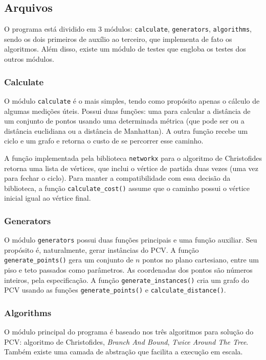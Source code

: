\documentclass{article}
\begin{document}
\subsection{Arquivos}
O programa está dividido em 3 módulos: \texttt{calculate}, \texttt{generators}, \texttt{algorithms}, sendo os dois primeiros de auxílio ao terceiro, que implementa de fato os algoritmos. Além disso, existe um módulo de testes que engloba os testes dos outros módulos.

\subsubsection{Calculate}

O módulo \texttt{calculate} é o mais simples, tendo como propósito apenas o cálculo de algumas medições úteis. Possui duas funções: uma para calcular a distância de um conjunto de pontos usando uma determinada métrica (que pode ser ou a distância euclidiana ou a distância de Manhattan). A outra função recebe um ciclo e um grafo e retorna o custo de se percorrer esse caminho.

A função implementada pela biblioteca \texttt{networkx} para o algoritmo de Christofides retorna uma lista de vértices, que inclui o vértice de partida duas vezes (uma vez para fechar o ciclo). Para manter a compatibilidade com essa decisão da biblioteca, a função \texttt{calculate\_cost()} assume que o caminho possui o vértice inicial igual ao vértice final.

\subsubsection{Generators}

O módulo \texttt{generators} possui duas funções principais e uma função auxiliar. Seu propósito é, naturalmente, gerar instâncias do PCV. A função \texttt{generate\_points()} gera um conjunto de \( n \) pontos no plano cartesiano, entre um piso e teto passados como parâmetros. As coordenadas dos pontos são números inteiros, pela especificação. A função \texttt{generate\_instances()} cria um grafo do PCV usando as funções \texttt{generate\_points()} e \texttt{calculate\_distance()}.


\subsubsection{Algorithms}

O módulo principal do programa é baseado nos três algoritmos para solução do PCV: algoritmo de Christofides, \textit{Branch And Bound}, \textit{Twice Around The Tree}. Também existe uma camada de abstração que facilita a execução em escala.
\end{document}
